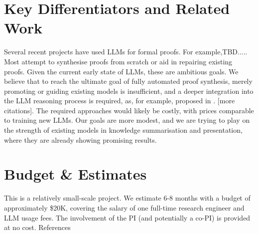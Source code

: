 \documentclass[letterpaper]{article}
\begin{document}
\section*{Key Differentiators and Related Work}

Several recent projects have used LLMs for formal proofs. For
example,TBD.....  Most attempt to synthesise proofs from scratch or
aid in repairing existing proofs. Given the current early state of
LLMs, these are ambitious goals. We believe that to reach the ultimate
goal of fully automated proof synthesis, merely promoting or guiding
existing models is insufficient, and a deeper integration into the LLM
reasoning process is required, as, for example, proposed in
\cite{park2024grammaraligneddecoding}. [more citations]. The required
approaches would likely be costly, with prices comparable to training
new LLMs. Our goals are more modest, and we are trying to play on the
strength of existing models in knowledge summarisation and
presentation, where they are already showing promising results.

\section*{Budget \& Estimates}

This is a relatively small-scale project. We estimate 6-8 months with
a budget of approximately \$20K, covering the salary of one full-time
research engineer and LLM usage fees. The involvement of the PI (and
potentially a co-PI) is provided at no cost.  References



\end{document}
